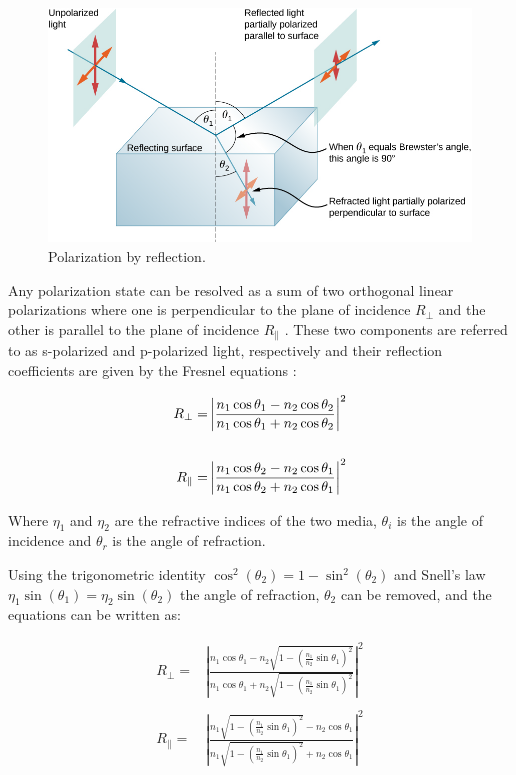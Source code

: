 \begin{figure}[H]
    \centering
    \includegraphics[width=\textwidth]{figures/polarization/reflaction.png}
    \caption{Polarization by reflection. \cite[Figure 1.38]{lingUniversityPhysicsVolume2016}}
    \label{fig:polarized_reflection}
\end{figure}


Any polarization state can be resolved as a sum of two orthogonal linear polarizations where one is perpendicular to the plane of incidence $R_\perp$ and the other is parallel to the plane of incidence $R_\parallel$ \cite{FresnelEquations2023}.
These two components are referred to as s-polarized and p-polarized light, respectively and their reflection coefficients are given by the Fresnel equations \cite{FresnelEquations2023}:

\begin{align}
    \centering
    R_\perp =         & \left|{\frac {n_{1}\cos \theta _1-n_{2}\cos \theta _2}{n_{1}\cos \theta _1+n_{2}\cos \theta _2}}\right|^{2} \\
    \\
    R_\parallel     = & \left|{\frac {n_{1}\cos \theta _2-n_{2}\cos \theta _1}{n_{1}\cos \theta _2+n_{2}\cos \theta _1}}\right|^{2}
\end{align}

Where  $\eta_1$ and $\eta_2$ are the refractive indices of the two media,
$\theta_i$ is the angle of incidence and $\theta_r$ is the angle of refraction.

Using the trigonometric identity $ \cos^2{\left(\theta_2 \right)} = 1- \sin^2{\left(\theta_2 \right)}$ and Snell's law $\eta_1 \sin{\left(\theta_1 \right)} = \eta_2 \sin{\left(\theta_2 \right)}$ the angle of refraction, $\theta_2$ can be removed, and the equations can be written as:

\begin{align}
    R_\perp =         & \left|{\frac {n_{1}\cos \theta _1-n_{2}{\sqrt {1-\left({\frac {n_{1}}{n_{2}}}\sin \theta _1\right)^{2}}}}{n_{1}\cos \theta _1+n_{2}{\sqrt {1-\left({\frac {n_{1}}{n_{2}}}\sin \theta _1\right)^{2}}}}}\right|^{2} \\
    \\
    R_\parallel     = & \left|{\frac {n_{1}{\sqrt {1-\left({\frac {n_{1}}{n_{2}}}\sin \theta _1\right)^{2}}}-n_{2}\cos \theta _1}{n_{1}{\sqrt {1-\left({\frac {n_{1}}{n_{2}}}\sin \theta _1\right)^{2}}}+n_{2}\cos \theta _1}}\right|^{2}
\end{align}


